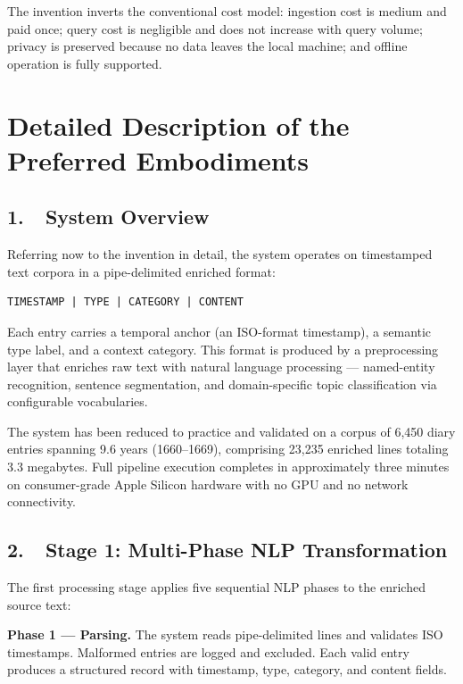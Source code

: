 \documentclass[12pt,letterpaper]{article}
\begin{document}
The invention inverts the conventional cost model: ingestion cost is medium and paid
once; query cost is negligible and does not increase with query volume; privacy is
preserved because no data leaves the local machine; and offline operation is fully
supported.

\section*{Detailed Description of the Preferred Embodiments}

\subsection*{1.\ \ System Overview}

Referring now to the invention in detail, the system operates on timestamped text
corpora in a pipe-delimited enriched format:

\begin{lstlisting}
TIMESTAMP | TYPE | CATEGORY | CONTENT
\end{lstlisting}

Each entry carries a temporal anchor (an ISO-format timestamp), a semantic type label,
and a context category. This format is produced by a preprocessing layer that enriches
raw text with natural language processing --- named-entity recognition, sentence
segmentation, and domain-specific topic classification via configurable vocabularies.

The system has been reduced to practice and validated on a corpus of 6,450 diary
entries spanning 9.6 years (1660--1669), comprising 23,235 enriched lines totaling
3.3 megabytes. Full pipeline execution completes in approximately three minutes on
consumer-grade Apple Silicon hardware with no GPU and no network connectivity.

\subsection*{2.\ \ Stage 1: Multi-Phase NLP Transformation}

The first processing stage applies five sequential NLP phases to the enriched source
text:

\textbf{Phase 1 --- Parsing.} The system reads pipe-delimited lines and validates ISO
timestamps. Malformed entries are logged and excluded. Each valid entry produces a
structured record with timestamp, type, category, and content fields.
\end{document}
